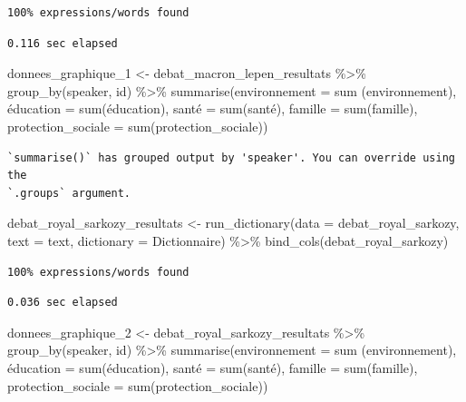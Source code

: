 \documentclass[
  letterpaper,
  DIV=11,
  numbers=noendperiod]{scrartcl}
\newenvironment{Shaded}{\begin{snugshade}}{\end{snugshade}}
\newcommand{\AttributeTok}[1]{\textcolor[rgb]{0.40,0.45,0.13}{#1}}
\newcommand{\FunctionTok}[1]{\textcolor[rgb]{0.28,0.35,0.67}{#1}}
\newcommand{\NormalTok}[1]{\textcolor[rgb]{0.00,0.23,0.31}{#1}}
\newcommand{\OtherTok}[1]{\textcolor[rgb]{0.00,0.23,0.31}{#1}}
\newcommand{\SpecialCharTok}[1]{\textcolor[rgb]{0.37,0.37,0.37}{#1}}
\begin{document}
\begin{verbatim}
100% expressions/words found
\end{verbatim}

\begin{verbatim}
0.116 sec elapsed
\end{verbatim}

\begin{Shaded}
\begin{Highlighting}[]
\NormalTok{donnees\_graphique\_1 }\OtherTok{\textless{}{-}}\NormalTok{ debat\_macron\_lepen\_resultats }\SpecialCharTok{\%\textgreater{}\%} \FunctionTok{group\_by}\NormalTok{(speaker, id) }\SpecialCharTok{\%\textgreater{}\%} \FunctionTok{summarise}\NormalTok{(}\AttributeTok{environnement =} \FunctionTok{sum}\NormalTok{ (environnement), é}\AttributeTok{ducation =} \FunctionTok{sum}\NormalTok{(éducation), santé }\OtherTok{=} \FunctionTok{sum}\NormalTok{(santé), }\AttributeTok{famille =} \FunctionTok{sum}\NormalTok{(famille), }\AttributeTok{protection\_sociale =} \FunctionTok{sum}\NormalTok{(protection\_sociale))}
\end{Highlighting}
\end{Shaded}

\begin{verbatim}
`summarise()` has grouped output by 'speaker'. You can override using the
`.groups` argument.
\end{verbatim}

\begin{Shaded}
\begin{Highlighting}[]
\NormalTok{debat\_royal\_sarkozy\_resultats }\OtherTok{\textless{}{-}} \FunctionTok{run\_dictionary}\NormalTok{(}\AttributeTok{data =}\NormalTok{ debat\_royal\_sarkozy, }\AttributeTok{text =}\NormalTok{ text, }\AttributeTok{dictionary =}\NormalTok{ Dictionnaire) }\SpecialCharTok{\%\textgreater{}\%} \FunctionTok{bind\_cols}\NormalTok{(debat\_royal\_sarkozy)}
\end{Highlighting}
\end{Shaded}

\begin{verbatim}
100% expressions/words found
\end{verbatim}

\begin{verbatim}
0.036 sec elapsed
\end{verbatim}

\begin{Shaded}
\begin{Highlighting}[]
\NormalTok{donnees\_graphique\_2 }\OtherTok{\textless{}{-}}\NormalTok{ debat\_royal\_sarkozy\_resultats }\SpecialCharTok{\%\textgreater{}\%} \FunctionTok{group\_by}\NormalTok{(speaker, id) }\SpecialCharTok{\%\textgreater{}\%} \FunctionTok{summarise}\NormalTok{(}\AttributeTok{environnement =} \FunctionTok{sum}\NormalTok{ (environnement), é}\AttributeTok{ducation =} \FunctionTok{sum}\NormalTok{(éducation), santé }\OtherTok{=} \FunctionTok{sum}\NormalTok{(santé), }\AttributeTok{famille =} \FunctionTok{sum}\NormalTok{(famille), }\AttributeTok{protection\_sociale =} \FunctionTok{sum}\NormalTok{(protection\_sociale))}
\end{Highlighting}
\end{Shaded}
\end{document}
